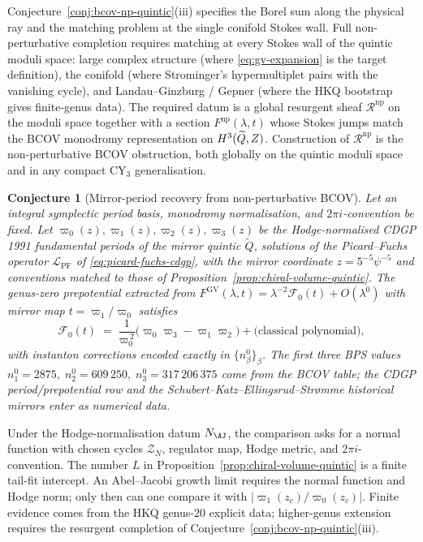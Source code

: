 \documentclass[12pt]{amsart}
\newtheorem{conj}[thm]{Conjecture}
\theoremstyle{remark}
\providecommand{\NAJ}{N_{\AJ}}
\begin{document}
Conjecture~\ref{conj:bcov-np-quintic}(iii) specifies the Borel sum
along the physical ray and the matching problem at the single conifold
Stokes wall.  Full
non-perturbative completion requires matching at every Stokes wall of
the quintic moduli space: large complex structure (where
\eqref{eq:gv-expansion} is the target definition), the conifold (where
Strominger's hypermultiplet pairs with the vanishing cycle), and
Landau--Ginzburg / Gepner (where the HKQ bootstrap gives
finite-genus data).  The required datum is a global resurgent sheaf
\(\mathcal R^{\mathrm{np}}\) on the moduli space together with a
section \(F^{\mathrm{np}}(\lambda,t)\) whose Stokes jumps match the BCOV
monodromy representation on \(H^3(\widetilde Q,Z)\).  Construction of
\(\mathcal R^{\mathrm{np}}\) is the non-perturbative BCOV obstruction,
both globally on the quintic moduli space and in any compact CY\(_3\)
generalisation.

\begin{conj}[Mirror-period recovery from non-perturbative BCOV]
  \label{conj:mirror-period-recovery}
  Let an integral symplectic period basis, monodromy normalisation, and
  \(2\pi i\)-convention be fixed.  Let
  \(\varpi_0(z),\varpi_1(z),\varpi_2(z),\varpi_3(z)\) be the
  Hodge-normalised CDGP 1991 fundamental periods of the mirror quintic
  \(\widetilde Q\), solutions of the Picard--Fuchs operator
  \(\mathcal L_{\mathrm{PF}}\) of \eqref{eq:picard-fuchs-cdgp}, with
  the mirror coordinate \(z=5^{-5}\psi^{-5}\) and conventions matched
  to those of Proposition~\ref{prop:chiral-volume-quintic}.  The
  genus-zero prepotential extracted from
  \(F^{\mathrm{GV}}(\lambda,t)=\lambda^{-2}\mathcal F_0(t)+O(\lambda^0)\)
  with mirror map \(t=\varpi_1/\varpi_0\) satisfies
  \[
    \mathcal F_0(t) \;=\;
    \frac{1}{\varpi_0^{\,2}}\bigl(\varpi_0\varpi_3-\varpi_1\varpi_2\bigr)
    + \text{(classical polynomial)},
  \]
  with instanton corrections encoded exactly in
  \(\{n_\beta^0\}_\beta\).  The first three BPS values
  \(n_1^0=2875,\;n_2^0=609\,250,\;n_3^0=317\,206\,375\) come from the
  BCOV table; the CDGP period/prepotential row and the
  Schubert--Katz--Ellingsrud--Str\o mme historical mirrors enter as
  numerical data.
\end{conj}

Under the Hodge-normalisation datum \(\NAJ\), the comparison asks for a
normal function with chosen cycles \(\mathcal Z_N\), regulator map, Hodge
metric, and \(2\pi i\)-convention.  The number \(L\) in
Proposition~\ref{prop:chiral-volume-quintic} is a finite tail-fit
intercept.  An Abel--Jacobi growth limit requires the normal function and
Hodge norm; only then can one compare it with
\(|\varpi_1(z_c)/\varpi_0(z_c)|\).  Finite evidence comes from the HKQ
genus-\(20\) explicit data; higher-genus extension requires the resurgent
completion of Conjecture~\ref{conj:bcov-np-quintic}(iii).
\end{document}
